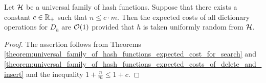 \begin{corollary}\label{corollary:constant_expected_costs_of_dictionary_operations_for_simple_uniform_hashing}
Let ${\mathcal H}$ be a universal family of hash functions. Suppose that there exists a constant $c\in {\mathbb R}_+$ such that $n\leq c\cdot m$. Then the expected costs of all dictionary operations for $D_h$ are ${\mathcal O}(1)$ provided that $h$ is taken uniformly random from ${\mathcal H}$.
\end{corollary}
\begin{proof}
The assertion follows from Theorems \ref{theorem:universal_family_of_hash_functions_expected_cost_for_search} and \ref{theorem:universal_family_of_hash_functions_expected_costs_of_delete_and_insert} and the inequality $1 + \frac{n}{m} \leq 1 + c$.
\end{proof}




















\small



